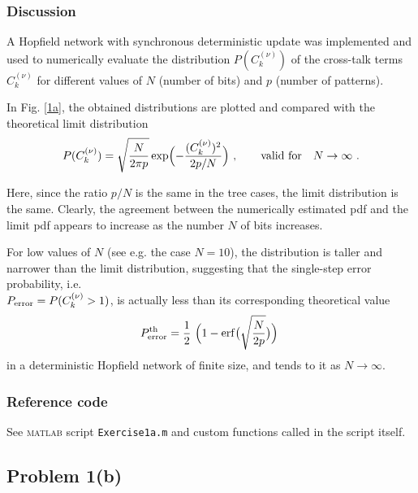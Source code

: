 \documentclass[12pt,A4,titlepage]{article}
\DeclareMathOperator\erf{erf}
\begin{document}
\subsubsection*{Discussion}

A Hopfield network with synchronous deterministic update was implemented and used to numerically evaluate the distribution $P(C^{(\nu)}_k)$ of the cross-talk terms $C^{(\nu)}_k$ for different values of $N$ (number of bits) and $p$ (number of patterns).

In Fig. \ref{1a}, the obtained distributions are plotted and compared with the theoretical limit distribution
\begin{equation}
P(C^{(\nu)}_k) = \sqrt{\dfrac{N}{2 \pi p}} \exp\Bigl( - \dfrac{(C^{(\nu)}_k)^2}{2p / N}\Bigr) \ ,\qquad \text{valid for} \quad N \rightarrow \infty \ .
\end{equation}

Here, since the ratio $p/N$ is the same in the tree cases, the limit distribution is the same. Clearly, the agreement between the numerically estimated pdf and the limit pdf appears to increase as the number $N$ of bits increases.

For low values of $N$ (see e.g. the case $N = 10$), the distribution is taller and narrower than the limit distribution, suggesting that the single-step error probability, i.e. \\$P_{\textup{error}} = P(C^{(\nu)}_k > 1)$, is actually less than its corresponding theoretical value 
\begin{equation}
P_{\textup{error}}^{\textup{th}} = \frac{1}{2} \ \Bigl( 1 - \erf\bigl(\sqrt{\dfrac{N}{2p}}\bigr)\Bigr) \
\label{errorProb}
\end{equation}
in a deterministic Hopfield network of finite size, and tends to it as $N \rightarrow \infty$.
\subsubsection*{Reference code}
See \textsc{matlab} script \texttt{Exercise1a.m} and custom functions called in the script itself.


\clearpage

\subsection*{Problem 1(b)}
\end{document}
